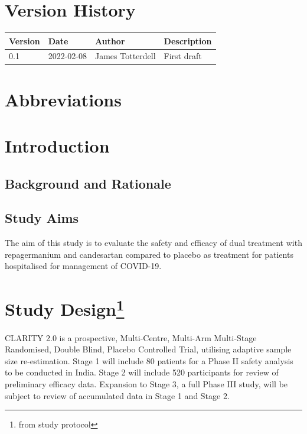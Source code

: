 \documentclass[11pt,parskip=full-]{scrartcl}
\begin{document}
\section*{Version History}

\begin{table}[H]
    \begin{center}
        \begin{tabular}{lllp{5cm}}
            \hline
            Version & Date       & Author           & Description \\
            \hline
            0.1     & 2022-02-08 & James Totterdell & First draft \\
            \hline
        \end{tabular}
    \end{center}
\end{table}

\section*{Abbreviations}

\clearpage

\section{Introduction}

\subsection{Background and Rationale}

\subsection{Study Aims}
The aim of this study is to evaluate the safety and efficacy of dual treatment with repagermanium and candesartan compared to placebo as treatment for patients hospitalised for management of COVID-19.

\clearpage

\section[Study Design]{Study Design\protect\footnote{from study protocol}}
CLARITY 2.0 is a prospective, Multi-Centre, Multi-Arm Multi-Stage Randomised, Double Blind, Placebo Controlled Trial, utilising adaptive sample size re-estimation. Stage 1 will include 80 patients for a Phase II safety analysis to be conducted in India. Stage 2 will include 520 participants for review of preliminary efficacy data. Expansion to Stage 3, a full Phase III study, will be subject to review of accumulated data in Stage 1 and Stage 2.
\end{document}
